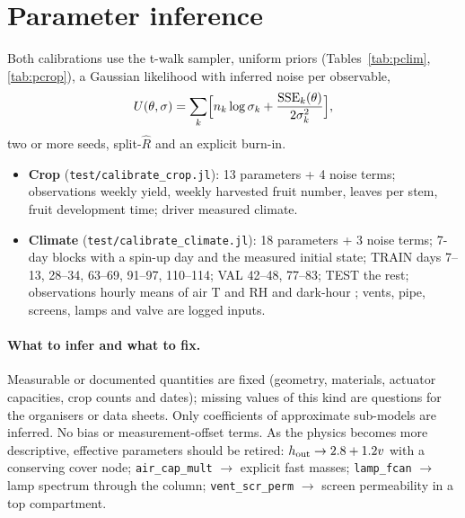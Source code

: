 \documentclass[11pt,a4paper]{article}
\newcommand{\code}[1]{\texttt{#1}}
\begin{document}
\section{Parameter inference}\label{sec:inference}
Both calibrations use the t-walk sampler, uniform priors (Tables~\ref{tab:pclim}, \ref{tab:pcrop}), a Gaussian likelihood
with inferred noise per observable,
\begin{equation}
U(\theta,\sigma)=\sum_k\Bigl[n_k\log\sigma_k+\frac{\mathrm{SSE}_k(\theta)}{2\sigma_k^2}\Bigr],
\end{equation}
two or more seeds, split-$\hat R$ and an explicit burn-in.
\begin{itemize}[nosep]
\item \textbf{Crop} (\code{test/calibrate\_crop.jl}): 13 parameters + 4 noise terms; observations weekly yield, weekly
harvested fruit number, leaves per stem, fruit development time; driver measured climate.
\item \textbf{Climate} (\code{test/calibrate\_climate.jl}): 18 parameters + 3 noise terms; 7-day blocks with a spin-up day and the
measured initial state; TRAIN days 7--13, 28--34, 63--69, 91--97, 110--114; VAL 42--48, 77--83; TEST the rest; observations
hourly means of air T and RH and dark-hour ; vents, pipe, screens, lamps and  valve are logged inputs.
\end{itemize}
\paragraph{What to infer and what to fix.} Measurable or documented quantities are fixed (geometry, materials, actuator
capacities, crop counts and dates); missing values of this kind are questions for the organisers or data sheets. Only
coefficients of approximate sub-models are inferred. No bias or measurement-offset terms. As the physics becomes more
descriptive, effective parameters should be retired: $h_{\rm out}\to2.8+1.2v$ with a conserving cover node;
\code{air\_cap\_mult} $\to$ explicit fast masses; \code{lamp\_fcan} $\to$ lamp spectrum through the column;
\code{vent\_scr\_perm} $\to$ screen permeability in a top compartment.


\end{document}
